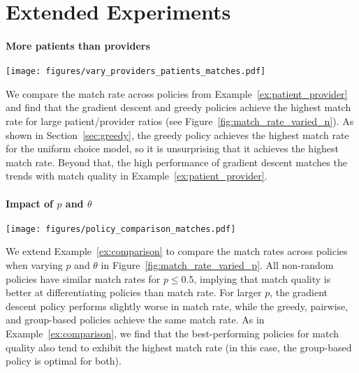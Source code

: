 \section{Extended Experiments}
\label{sec:more_experiments}
\paragraph{More patients than providers}
\begin{figure*}
    \texttt{[image: figures/vary\_providers\_patients\_matches.pdf]}
    \caption{We compare the match rate across policies when varying the patient/provider ratio, and find that the greedy and gradient descent policies perform best, while the group-based and pairwise policies lag.}
    \label{fig:match_rate_varied_n}
\end{figure*}
We compare the match rate across policies from Example~\ref{ex:patient_provider} and find that the gradient descent and greedy policies achieve the highest match rate for large patient/provider ratios (see Figure~\ref{fig:match_rate_varied_n}). 
As shown in Section~\ref{sec:greedy}, the greedy policy achieves the highest match rate for the uniform choice model, so it is unsurprising that it achieves the highest match rate. 
Beyond that, the high performance of gradient descent matches the trends with match quality in Example~\ref{ex:patient_provider}. 

\paragraph{Impact of $p$ and $\theta$}
\begin{figure*}
    \texttt{[image: figures/policy\_comparison\_matches.pdf]}
    \caption{For $p \leq 0.5$, we find that all four policies achieve the same match rate, while for $p \geq 0.75$, we find that gradient descent achieves a slightly lower match rate compared to the greedy, pairwise, and group-based policies. }
    \label{fig:match_rate_varied_p}
\end{figure*}
We extend Example~\ref{ex:comparison} to compare the match rates across policies when varying $p$ and $\theta$ in Figure~\ref{fig:match_rate_varied_p}. 
All non-random policies have similar match rates for $p \leq 0.5$, implying that match quality is better at differentiating policies than match rate.
For larger $p$, the gradient descent policy performs slightly worse in match rate, while the greedy, pairwise, and group-based policies achieve the same match rate. 
As in Example~\ref{ex:comparison}, we find that the best-performing policies for match quality also tend to exhibit the highest match rate (in this case, the group-based policy is optimal for both). 

